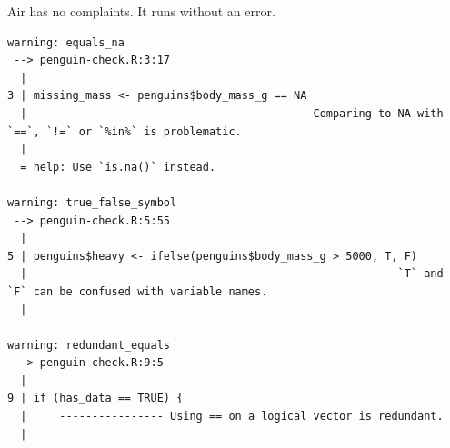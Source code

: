 \documentclass[
  letterpaper,
  justified,
  a4paper]{tufte-book}
\makeatletter
\newenvironment{Shaded}{\begin{snugshade}}{\end{snugshade}}
\newcommand{\ConstantTok}[1]{\textcolor[rgb]{0.56,0.35,0.01}{#1}}
\newcommand{\ControlFlowTok}[1]{\textcolor[rgb]{0.00,0.23,0.31}{\textbf{#1}}}
\newcommand{\DecValTok}[1]{\textcolor[rgb]{0.68,0.00,0.00}{#1}}
\newcommand{\ExtensionTok}[1]{\textcolor[rgb]{0.00,0.23,0.31}{#1}}
\newcommand{\FunctionTok}[1]{\textcolor[rgb]{0.28,0.35,0.67}{#1}}
\newcommand{\NormalTok}[1]{\textcolor[rgb]{0.00,0.23,0.31}{#1}}
\newcommand{\OtherTok}[1]{\textcolor[rgb]{0.00,0.23,0.31}{#1}}
\newcommand{\SpecialCharTok}[1]{\textcolor[rgb]{0.37,0.37,0.37}{#1}}
\newcommand{\StringTok}[1]{\textcolor[rgb]{0.13,0.47,0.30}{#1}}
\let\rbporigShaded\Shaded
\let\rbporigendShaded\endShaded
\renewenvironment{Shaded}{%
  \begingroup
  \ifdim\linewidth=\rbpbodywidth
    \advance\linewidth by \@tufte@overhang
    \advance\hsize by \@tufte@overhang
    \advance\columnwidth by \@tufte@overhang
  \fi
  \rbporigShaded
}{%
  \rbporigendShaded
  \endgroup
}
\makeatother
\begin{document}
\begin{Shaded}
\end{Shaded}

Air has no complaints. It runs without an error.

\begin{Shaded}
\end{Shaded}

\begin{verbatim}
warning: equals_na
 --> penguin-check.R:3:17
  |
3 | missing_mass <- penguins$body_mass_g == NA
  |                 -------------------------- Comparing to NA with `==`, `!=` or `%in%` is problematic.
  |
  = help: Use `is.na()` instead.

warning: true_false_symbol
 --> penguin-check.R:5:55
  |
5 | penguins$heavy <- ifelse(penguins$body_mass_g > 5000, T, F)
  |                                                       - `T` and `F` can be confused with variable names.
  |

warning: redundant_equals
 --> penguin-check.R:9:5
  |
9 | if (has_data == TRUE) {
  |     ---------------- Using == on a logical vector is redundant.
  |
\end{verbatim}
\end{document}
